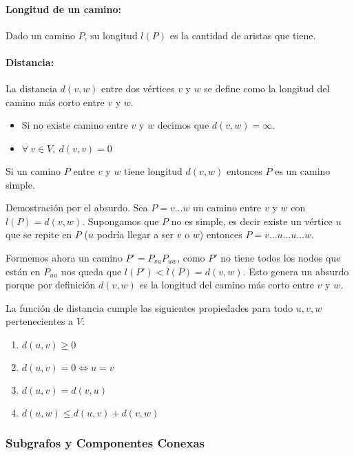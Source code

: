 \paragraph{Longitud de un camino:} Dado un camino \(P\), su longitud \(l(P)\) es la cantidad de aristas que tiene.

\paragraph{Distancia:} La distancia \(d(v,w)\) entre dos vértices \(v\) y \(w\) se define como la longitud del camino más corto entre \(v\) y \(w\). 
\begin{itemize}
	\item Si no existe camino entre \(v\) y \(w\) decimos que \(d(v,w) = \infty\).
	\item \(\forall~v\in V,~d(v,v) = 0\)
\end{itemize}

\begin{proposicion}
	Si un camino \(P\) entre \(v\) y \(w\) tiene longitud \(d(v,w)\) entonces \(P\) es un camino simple.
\end{proposicion}
\begin{demo}
	Demostración por el absurdo. Sea \(P = v\dots w\) un camino entre \(v\) y \(w\) con \(l(P) = d(v,w)\). Supongamos que \(P\) no es simple, es decir existe un vértice \(u\) que se repite en \(P\) (\(u\) podría llegar a ser \(v\) o \(w\)) entonces \(P = v\dots u \dots u \dots w\).
	
	Formemos ahora un camino \(P' = P_{vu}P_{uw}\), como \(P'\) no tiene todos los nodos que están en \(P_{uu}\) nos queda que \(l(P') < l(P) = d(v,w)\). Esto genera un absurdo porque por definición \(d(v,w)\) es la longitud del camino más corto entre \(v\) y \(w\).
\end{demo}

\begin{proposicion}
	La función de distancia cumple las siguientes propiedades para todo \(u,v,w\) pertenecientes a \(V\):
	\begin{enumerate}
		\item \(d(u,v)\geq 0\)
		\item \(d(u,v)=0 \iff u=v\)
		\item \(d(u,v) = d(v,u)\)
		\item \(d(u,w) \leq d(u,v) + d(v,w)\)
	\end{enumerate}
\end{proposicion}

\subsubsection{Subgrafos y Componentes Conexas}


